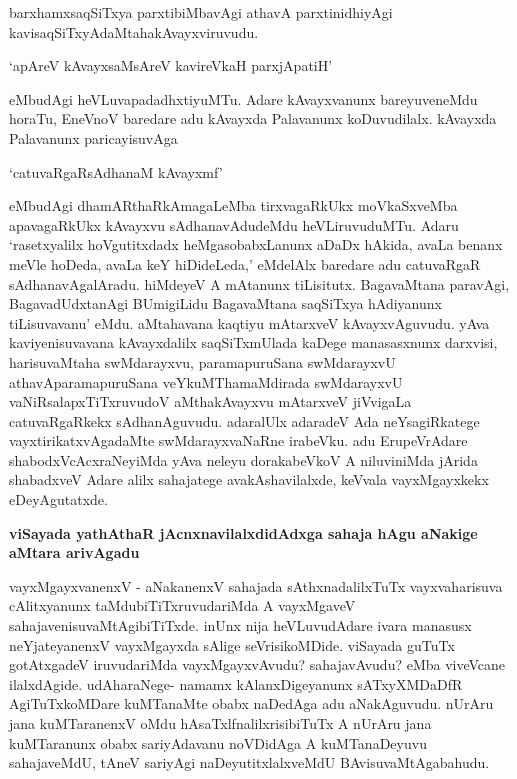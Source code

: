 \noindent
barxhamxsaqSiTxya parxtibiMbavAgi athavA parxtinidhiyAgi kavisaqSiTxyAdaMtaha\break kAvayxviruvudu. 

\begin{artha}
`apAreV kAvayxsaMsAreV kavireVkaH parxjApatiH'\label{page193} 
\end{artha}

eMbudAgi heVLuva\break padadhxtiyuMTu. Adare kAvayxvanunx bareyuve\-neMdu horaTu, EneVnoV baredare adu kAvayxda Palavanunx koDuvudilalx. kAvayxda Palavanunx paricayisu\-vAga 

\begin{artha}
`catu\-vaRgaRsAdhanaM kAvayxmf'\label{193} 
\end{artha}

eMbudAgi dhamARthaRkAmagaLeMba tirxvagaRkUkx moVkaSx\-veMba apavagaRkUkx kAvayxvu sAdhanavAdudeMdu heVLiruvuduMTu. Adaru `rasetx\-yalilx hoVgutitxdadx heMga\-sobabxLanunx aDaDx hAkida, avaLa benanx meVle hoDeda, avaLa keY hiDideLeda,' eMdelAlx baredare adu catu\-vaRgaR sAdhanavAgalAradu. hiMdeyeV A mAtanunx tiLisitutx. BagavaMtana paravAgi, BagavadUdxtanAgi BUmi\-giLidu BagavaMtana saqSiTxya hAdiyanunx tiLisuvavanu' eMdu. aMtahavana kaqtiyu mAtarxveV kAvayxvAguvudu. yAva kaviyenisuvavana kAvayxdalilx saqSiTxmUlada kaDege manasasxnunx darxvisi, harisu\-vaMtaha swMdarayxvu, paramapuruSana swMdarayxvU athavA\break paramapuruSana veYkuMThamaMdirada swMda\-rayxvU vaNiRsalapxTiTxruvudoV aMtha\break kAvayxvu mAtarxveV jiVvigaLa catuvaRgaRkekx sAdhanAguvudu. ada\-ralUlx adaradeV Ada neYsagiRkatege vayxtirikatxvAgadaMte swMdarayxvaNaRne irabeVku. adu Eru\-peVrA\-dare shabodxVcAcxraNeyiMda yAva neleyu dorakabeVkoV A niluviniMda jArida shabadxveV Adare alilx saha\-jatege avakAshavilalxde, keVvala vayxMgayxkekx eDeyAgutatxde.

{\bigskip
\noindent
{\large\bf viSayada yathAthaR jAcnxnavilalxdidAdxga sahaja hAgu aNakige aMtara arivAgadu}}\label{page194}
\medskip

\noindent
vayxMgayxvanenxV - aNakanenxV sahajada sAthxnadalilxTuTx vayxvaharisuva cAlitxyanunx taMdubiTiTxruvudariMda A vayxMgaveV sahajavenisuvaMtAgibiTiTxde. inUnx nija heVLuvudAdare ivara manasusx neYjateyanenxV vayxMgayxda sAlige seVrisikoMDide. viSayada guTuTx gotAtxgadeV iruvudariMda vayxMgayxvAvudu? sahajavAvudu? eMba viveVcane ilalxdAgide. udAharaNege- namamx kAlanxDigeyanunx sATxyXMDaDfR AgiTuTxkoMDare kuMTa\-naMte obabx naDedAga adu aNakAguvudu. nUrAru jana kuMTaranenxV oMdu hAsaTxlfnalilxrisibiTuTx A nUrAru jana kuMTaranunx obabx\- sariyAdavanu noVDidAga A kuMTanaDeyuvu sahajaveMdU, tAneV sariyAgi naDeyutitxlalxveMdU BAvisuvaMtAgabahudu.

